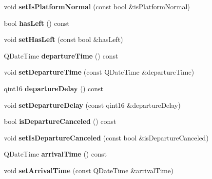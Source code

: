 \begin{DoxyCompactItemize}
void {\bfseries set\+Is\+Platform\+Normal} (const bool \&is\+Platform\+Normal)
\item 
\mbox{\label{classVehicleEngine_1_1Stop_a5abdef3141a5ecae9f80bafcb2ef059a}} 
bool {\bfseries has\+Left} () const
\item 
\mbox{\label{classVehicleEngine_1_1Stop_a2fb0dec57862278edcec9a0d5a299702}} 
void {\bfseries set\+Has\+Left} (const bool \&has\+Left)
\item 
\mbox{\label{classVehicleEngine_1_1Stop_a02e2288d7de6a29f1d1c0d0538da8af6}} 
Q\+Date\+Time {\bfseries departure\+Time} () const
\item 
\mbox{\label{classVehicleEngine_1_1Stop_afd2e78ce7eaf448d5f62f98a037d42a4}} 
void {\bfseries set\+Departure\+Time} (const Q\+Date\+Time \&departure\+Time)
\item 
\mbox{\label{classVehicleEngine_1_1Stop_a7b6c5d2802b9694dc3b01b5f6bf8f3dd}} 
qint16 {\bfseries departure\+Delay} () const
\item 
\mbox{\label{classVehicleEngine_1_1Stop_a284ce9074018f03319855c12a1e831e9}} 
void {\bfseries set\+Departure\+Delay} (const qint16 \&departure\+Delay)
\item 
\mbox{\label{classVehicleEngine_1_1Stop_a59323c8dfb1c2715efeb00810ab99418}} 
bool {\bfseries is\+Departure\+Canceled} () const
\item 
\mbox{\label{classVehicleEngine_1_1Stop_aa609dc4b54e919f081da57754bbbf8d3}} 
void {\bfseries set\+Is\+Departure\+Canceled} (const bool \&is\+Departure\+Canceled)
\item 
\mbox{\label{classVehicleEngine_1_1Stop_a473c5d32f259d7ec9096fd9b1938d915}} 
Q\+Date\+Time {\bfseries arrival\+Time} () const
\item 
\mbox{\label{classVehicleEngine_1_1Stop_aba98fbc0338e7cb670c7b9448527f930}} 
void {\bfseries set\+Arrival\+Time} (const Q\+Date\+Time \&arrival\+Time)

\end{DoxyCompactItemize}
